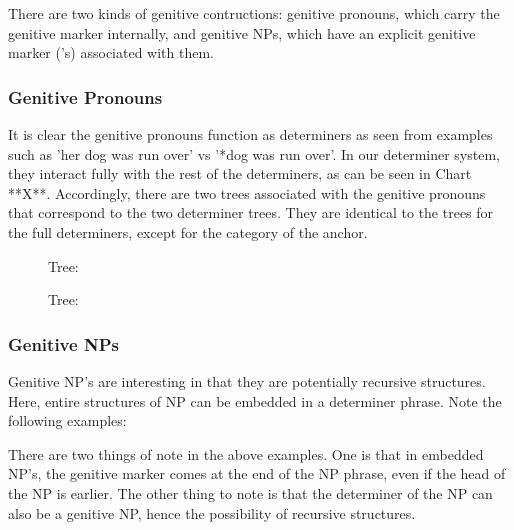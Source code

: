 There are two kinds of genitive contructions: genitive pronouns, which carry
the genitive marker internally, and genitive NPs, which have an explicit
genitive marker ('s) associated with them.

\subsubsection{Genitive Pronouns}

It is clear the genitive pronouns function as determiners as seen from examples
such as 'her dog was run over' vs '*dog was run over'.  In our determiner
system, they interact fully with the rest of the determiners, as can be seen in
Chart **X**.  Accordingly, there are two trees associated with the genitive
pronouns that correspond to the two determiner trees.  They are identical to
the trees for the full determiners, except for the category of the anchor.



\begin{figure}[ht]
\centering
\mbox{}
\caption{Tree:  }
\end{figure}


\begin{figure}[ht]
\centering
\mbox{}
\caption{Tree:  }
\end{figure}

\subsubsection{Genitive NPs}

Genitive NP's are interesting in that they are potentially recursive
structures.  Here, entire structures of NP can be embedded in a determiner
phrase.  Note the following examples:

  

There are two things of note in the above examples.  One is that in embedded
NP's, the genitive marker comes at the end of the NP phrase, even if the head
of the NP is earlier.  The other thing to note is that the determiner of the NP
can also be a genitive NP, hence the possibility of recursive structures.  

